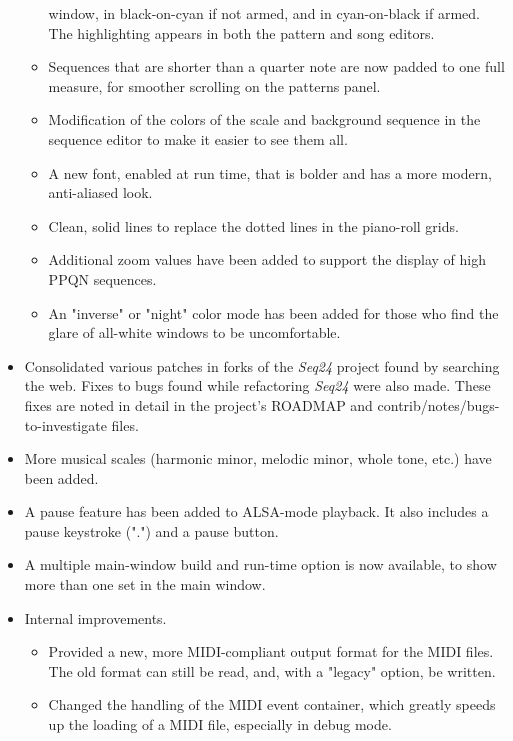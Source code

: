 \documentclass[
 11pt,
 twoside,
 a4paper,
 headinclude,
 footinclude,
 final                                 %
]{article}
\begin{document}
\begin{itemize}
\begin{itemize}
            window, in black-on-cyan if not armed, and in cyan-on-black if
            armed.  The highlighting appears in both the pattern and song
            editors.
         \item Sequences that are shorter than a quarter note are now padded to
            one full measure, for smoother scrolling on the patterns panel.
         \item Modification of the colors of the scale and background sequence
            in the sequence editor to make it easier to see them all.
         \item A new font, enabled at run time, that is bolder and has a
            more modern, anti-aliased look.
         \item Clean, solid lines to replace the dotted lines in the piano-roll
            grids.
         \item Additional zoom values have been added to support the display
            of high PPQN sequences.
         \item An "inverse" or "night" color mode has been added for those
            who find the glare of all-white windows to be uncomfortable.
      \end{itemize}
      \item Consolidated various patches in forks of the \textsl{Seq24}
         project found by searching the web.  Fixes to bugs found while
         refactoring \textsl{Seq24} were also made.  These fixes are noted in
         detail in the project's ROADMAP and contrib/notes/bugs-to-investigate
         files.
      \item More musical scales (harmonic minor, melodic minor,
         whole tone, etc.) have been added.
      \item A pause feature has been added to ALSA-mode playback.
         It also includes a pause keystroke (".") and a pause button.
      \item A multiple main-window build and run-time option is now available,
         to show more than one set in the main window.
      \item Internal improvements.
      \begin{itemize}
         \item Provided a new, more MIDI-compliant output format for the MIDI
            files.  The old format can still be read, and, with a "legacy"
            option, be written.
         \item Changed the handling of the MIDI event container, which greatly
            speeds up the loading of a MIDI file, especially in debug mode.

\end{itemize}
\end{itemize}
\end{document}
